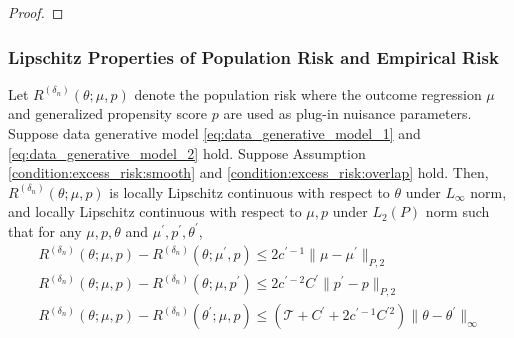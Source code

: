 \begin{proof}
\end{proof}


\subsubsection{Lipschitz Properties of Population Risk and Empirical Risk}

\begin{lemma}\label{lemma:lipschitz_population_risk}
Let $R^{({\delta_n})}(\theta;\mu,p)$
denote the population risk where the outcome regression $\mu$ and generalized propensity score $p$ are used as plug-in nuisance parameters. Suppose data generative model \eqref{eq:data_generative_model_1} and \eqref{eq:data_generative_model_2} hold. Suppose Assumption \ref{condition:excess_risk:smooth} and \ref{condition:excess_risk:overlap} hold. Then, $R^{({\delta_n})}(\theta;\mu,p)$ is locally Lipschitz continuous with respect to $\theta$ under $L_\infty$ norm, and locally Lipschitz continuous with respect to $\mu,p$ under $L_2(P)$ norm such that for any $\mu,p,\theta$ and $\mu^\prime,p^\prime,\theta^\prime$,
\begin{gather*}
    R^{({\delta_n})}(\theta;\mu, p) - R^{({\delta_n})}(\theta;\mu^\prime, p)\leq 2c^{\prime-1}\|\mu-\mu^\prime\|_{P,2}\\
    R^{({\delta_n})}(\theta;\mu, p) - R^{({\delta_n})}(\theta;\mu, p^\prime)\leq 2c^{\prime-2}C^{\prime}\|p^\prime - p\|_{P,2} \\
         R^{({\delta_n})}(\theta;\mu,p) - R^{({\delta_n})}(\theta^\prime;\mu,p)\leq (\mathcal{T}+C^\prime+2c^{\prime-1}C^{\prime2})\|\theta-\theta^\prime\|_{\infty}
\end{gather*}
\end{lemma}
